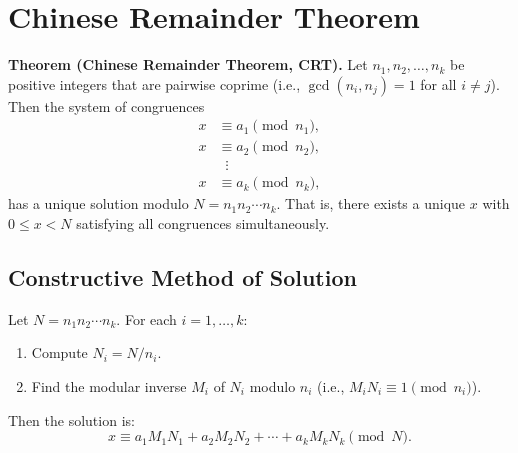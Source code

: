\documentclass[11pt,a4paper]{article}
\begin{document}
\section{Chinese Remainder Theorem}

\textbf{Theorem (Chinese Remainder Theorem, CRT).} Let $n_1, n_2, \dots, n_k$ be positive integers that are pairwise coprime (i.e., $\gcd(n_i, n_j) = 1$ for all $i \neq j$). Then the system of congruences
\begin{align*}
    x &\equiv a_1 \pmod{n_1}, \\
    x &\equiv a_2 \pmod{n_2}, \\
    &\;\;\vdots \\
    x &\equiv a_k \pmod{n_k},
\end{align*}
has a unique solution modulo $N = n_1 n_2 \cdots n_k$. That is, there exists a unique $x$ with $0 \leq x < N$ satisfying all congruences simultaneously.

\subsection{Constructive Method of Solution}

Let $N = n_1 n_2 \cdots n_k$. For each $i = 1, \dots, k$:
\begin{enumerate}[label=\textbf{Step \arabic*:}]
    \item Compute $N_i = N / n_i$.
    \item Find the modular inverse $M_i$ of $N_i$ modulo $n_i$ (i.e., $M_i N_i \equiv 1 \pmod{n_i}$).
\end{enumerate}
Then the solution is:
\begin{equation*}
    x \equiv a_1 M_1 N_1 + a_2 M_2 N_2 + \cdots + a_k M_k N_k \pmod{N}.
\end{equation*}
\end{document}
